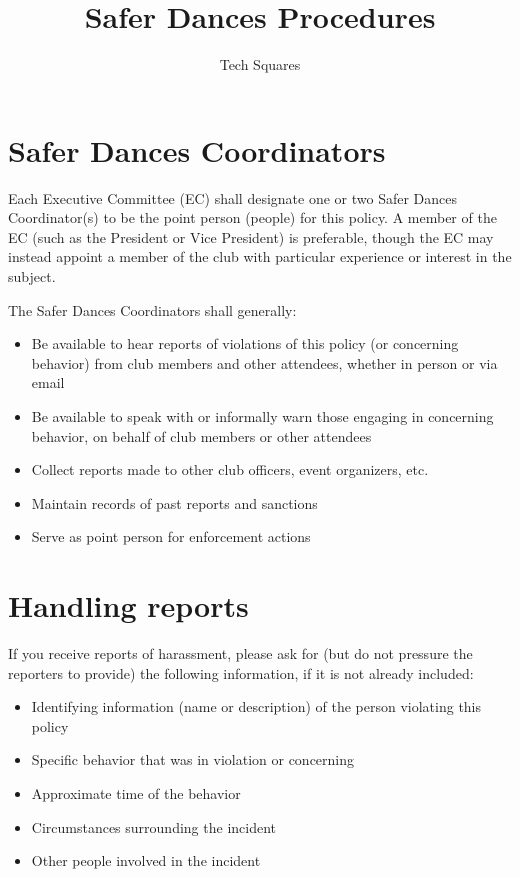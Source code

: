 \documentclass{article}
\title{Safer Dances Procedures}
\author{Tech Squares}
\date{}
\begin{document}
\maketitle

\section{Safer Dances Coordinators}

Each Executive Committee (EC) shall designate one or two Safer Dances Coordinator(s) to be the point person (people) for this policy. A member of the EC (such as the President or Vice President) is preferable, though the EC may instead appoint a member of the club with particular experience or interest in the subject.

The Safer Dances Coordinators shall generally:
\begin{itemize}
\item Be available to hear reports of violations of this policy (or concerning behavior) from club members and other attendees, whether in person or via email
\item Be available to speak with or informally warn those engaging in concerning behavior, on behalf of club members or other attendees
\item Collect reports made to other club officers, event organizers, etc.
\item Maintain records of past reports and sanctions
\item Serve as point person for enforcement actions
\end{itemize}


\section{Handling reports}

If you receive reports of harassment, please ask for (but do not pressure the reporters to provide) the following information, if it is not already included:

\begin{itemize}
\item Identifying information (name or description) of the person violating this policy
\item Specific behavior that was in violation or concerning
\item Approximate time of the behavior
\item Circumstances surrounding the incident
\item Other people involved in the incident
\end{itemize}
\end{document}
